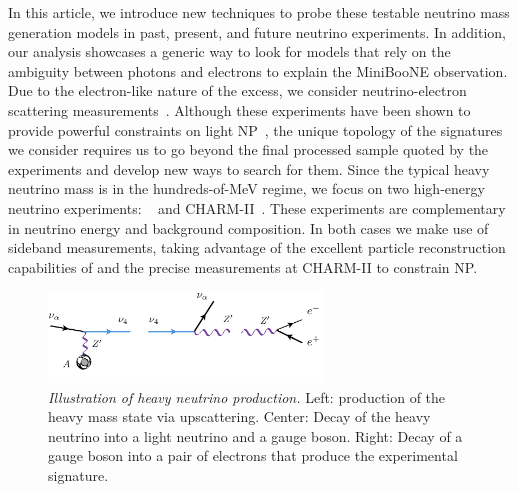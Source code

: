 In this article, we introduce new techniques to probe these testable neutrino mass generation models in past, present, and future neutrino experiments. In addition, our analysis showcases a generic way to look for models that rely on the ambiguity between photons and electrons to explain the MiniBooNE observation. Due to the electron-like nature of the excess, we consider neutrino-electron scattering measurements~\cite{Auerbach:2001wg, Deniz:2009mu,Bellini:2011rx,Park:2013dax,Vilain:1994qy}. Although these experiments have been shown to provide powerful constraints on light NP~\cite{Pospelov:2017kep,Lindner:2018kjo,Magill:2018tbb}, the unique topology of the signatures we consider requires us to go beyond the final processed sample quoted by the experiments and develop new ways to search for them.
Since the typical heavy neutrino mass is in the hundreds-of-MeV regime, we focus on two high-energy neutrino experiments: \minerva~\cite{Park:2013dax,Park:2015eqa,Valencia-Rodriguez:2016vkf} and CHARM-II~\cite{DeWinter:1989zg,Geiregat:1992zv,Vilain:1994qy}. These experiments are complementary in neutrino energy and background composition. In both cases we make use of sideband measurements, taking advantage of the excellent particle reconstruction capabilities of \minerva and the precise measurements at CHARM-II to constrain NP.
%
\begin{figure}[t!]
    \centering
    \includegraphics[width=0.65\textwidth]{diagram.pdf}
    \caption[Dark neutrino signal at MiniBooNE.]{{\textit{Illustration of heavy neutrino production.}} Left: production of the heavy mass state via upscattering. Center: Decay of the heavy neutrino into a light neutrino and a gauge boson. Right: Decay of a gauge boson into a pair of electrons that produce the experimental signature.\label{fig:diagram}}
\end{figure}

